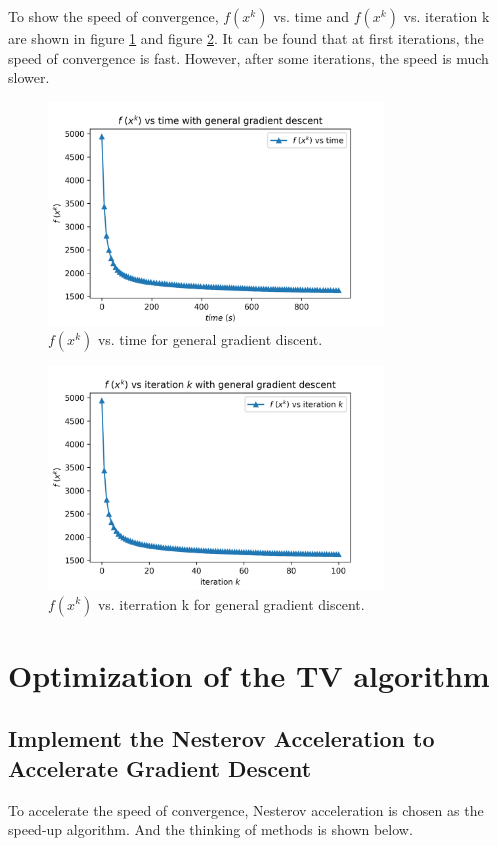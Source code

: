 \documentclass{article}
\begin{document}
To show the speed of convergence, $f(x^{k})$ vs. time and  $f(x^{k})$ vs. iteration k are shown in figure \ref{img8} and figure \ref{img9}. It can be found that at first iterations, the speed of convergence is fast. However, after some iterations, the speed is much slower.

\begin{figure}[h]
  \includegraphics[width=3.5in]{pic8.png}
  \centering
  \caption{$f(x^{k})$ vs. time for general gradient discent.}
  \label{img8}
\end{figure}

\begin{figure}[h]
  \includegraphics[width=3.5in]{pic9.png}
  \centering
  \caption{$f(x^{k})$ vs. iterration k for general gradient discent.}
  \label{img9}
\end{figure}

\section{Optimization of the TV algorithm}

\subsection{Implement the Nesterov Acceleration to Accelerate Gradient Descent}

To accelerate the speed of convergence, Nesterov acceleration is chosen as the speed-up algorithm. And the thinking of methods is shown below.
\end{document}
